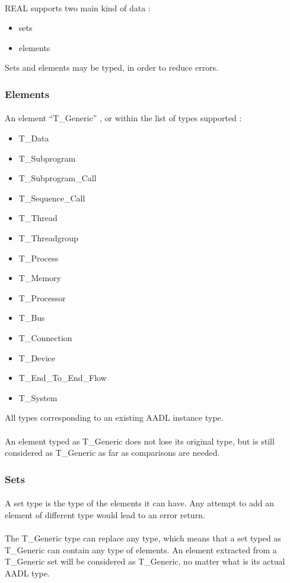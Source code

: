 
\paragraph{}
REAL supports two main kind of data :
\begin {itemize}
\item sets
\item elements
\end {itemize}
Sets and elements may be typed, in order to reduce 
errors. 

\subsubsection {Elements}
\paragraph{}
An element ``T\_Generic'' , or within the list of 
types supported :
\begin {itemize}
\item T\_Data
\item T\_Subprogram
\item T\_Subprogram\_Call
\item T\_Sequence\_Call
\item T\_Thread
\item T\_Threadgroup
\item T\_Process
\item T\_Memory
\item T\_Processor
\item T\_Bus
\item T\_Connection
\item T\_Device
\item T\_End\_To\_End\_Flow
\item T\_System
\end {itemize}
All types corresponding to an existing AADL instance type.

\paragraph{}
An element typed as T\_Generic does not lose its original 
type, but is still considered as T\_Generic as far as 
comparisons are needed.

\subsubsection {Sets}
\paragraph{}
A set type is the type of the elements it can have. Any 
attempt to add an element of different type would lead 
to an error return.

\paragraph{}
The T\_Generic type can replace any type, which means 
that a set typed as T\_Generic can contain any type 
of elements. An element extracted from a T\_Generic set
will be considered as T\_Generic, no matter what is its
actual AADL type.
